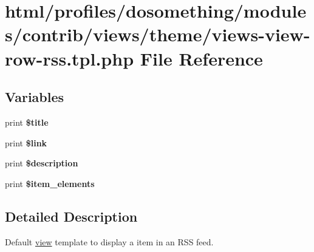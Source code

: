 \hypertarget{views-view-row-rss_8tpl_8php}{
\section{html/profiles/dosomething/modules/contrib/views/theme/views-\/view-\/row-\/rss.tpl.php File Reference}
\label{views-view-row-rss_8tpl_8php}
}
\subsection*{Variables}
\begin{DoxyCompactItemize}
\item 
\hypertarget{views-view-row-rss_8tpl_8php_aec2795512d255332f57cacd930a090b4}{
print {\bfseries \$title}}
\label{views-view-row-rss_8tpl_8php_aec2795512d255332f57cacd930a090b4}

\item 
\hypertarget{views-view-row-rss_8tpl_8php_aa6dcf0b94d1bbabe3406acb25a24f3f3}{
print {\bfseries \$link}}
\label{views-view-row-rss_8tpl_8php_aa6dcf0b94d1bbabe3406acb25a24f3f3}

\item 
\hypertarget{views-view-row-rss_8tpl_8php_a6f52c29993b17bf2650a9337fb56d41d}{
print {\bfseries \$description}}
\label{views-view-row-rss_8tpl_8php_a6f52c29993b17bf2650a9337fb56d41d}

\item 
\hypertarget{views-view-row-rss_8tpl_8php_a1335f1f65a2f0a0358b185d5132eb216}{
print {\bfseries \$item\_\-elements}}
\label{views-view-row-rss_8tpl_8php_a1335f1f65a2f0a0358b185d5132eb216}

\end{DoxyCompactItemize}


\subsection{Detailed Description}
Default \hyperlink{classview}{view} template to display a item in an RSS feed. 